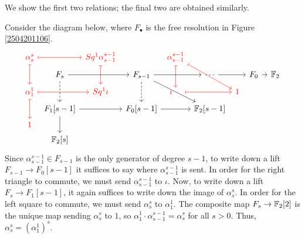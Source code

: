 \documentclass{MetricNotes2023}
\def\bb{\ensuremath\mathbb}
\def\textcolour{\textcolor}
\begin{document}
\begin{ourproof}
We show the first two relations; the final two are obtained similarly. %

Consider the diagram below, where \(F_\bullet\) is the free resolution in Figure \ref{2504201106}.
\[\begin{tikzcd}[row sep = 0.8ex, column sep=0.8ex]
\textcolour{red}{\alpha^s_s} \arrow[rr, "", mapsto, red] \arrow[dd, swap, "", red, mapsto]  & & \textcolour{red}{Sq^1\alpha^{s-1}_{s-1}}  \arrow[dd, ""', red, mapsto] & & \textcolour{red}{\alpha^{s-1}_{s-1}}  \arrow[dd, ""', red, mapsto] \arrow[rrdd, "", red, mapsto] & &&&& \\
& F_s \arrow[rr, swap, ""] \arrow[dd, ""', dashrightarrow] & & F_{s-1} \arrow[dd, ""', dashrightarrow] \arrow[rr, ""'] \arrow[rrdd] & & \cdots \arrow[rr] && F_0 \arrow[rr] && \bb{F}_2 \\
\textcolour{red}{\alpha^1_1} \arrow[rr, swap, "", red, mapsto] \arrow[dd, ""', red, mapsto] & & \textcolour{red}{Sq^1\iota} & & \textcolour{red}{\iota}\;\;\;\; \arrow[rr, ""', red, mapsto] & & \textcolour{red}{1} & & & \\
& F_1[s-1] \arrow[rr, swap, ""] \arrow[dd, ""'] & & F_0[s-1] \arrow[rr, ""'] & & \bb{F}_2[s-1] & & & &\\
\textcolour{red}{1} & &&&&&&&&\\
& \bb{F}_2[s] &&&&&&&&
\end{tikzcd}\]
Since \(\alpha^{s-1}_{s-1}\in F_{s-1}\) is the only generator of degree \(s-1\), to write down a lift \(F_{s-1}\to F_0[s-1]\) it suffices to say where \(\alpha^{s-1}_{s-1}\) is sent. In order for the right triangle to commute, we must send \(\alpha^{s-1}_{s-1}\) to \(\iota\). Now, to write down a lift \(F_s \to F_1[s-1]\), it again suffices to write down the image of \(\alpha^s_s\). In order for the left square to commute, we must send \(\alpha^s_s\) to \(\alpha^1_1\). The composite map \(F_s \to \bb{F}_2[2]\) is the unique map sending \(\alpha^s_s\) to \(1\), so \(\alpha^1_1\cdot \alpha^{s-1}_{s-1}=\alpha^s_s\) for all \(s>0\). Thus, \(\alpha^s_s=(\alpha^1_1)^s\). 


\end{ourproof}
\end{document}
